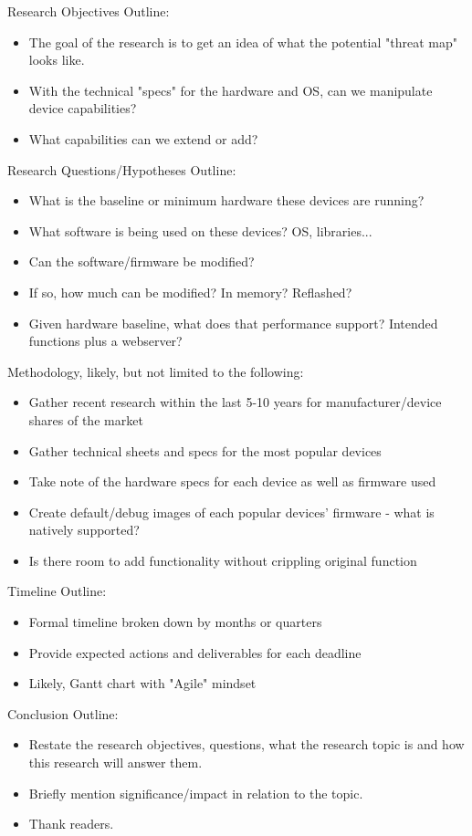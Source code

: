 
Research Objectives Outline:
\begin{itemize}
  \item The goal of the research is to get an idea of what the potential "threat map" looks like.
  \item With the technical "specs" for the hardware and OS, can we manipulate device capabilities?
  \item What capabilities can we extend or add?
\end{itemize}

Research Questions/Hypotheses Outline:
\begin{itemize}
  \item What is the baseline or minimum hardware these devices are running?
  \item What software is being used on these devices? OS, libraries...
  \item Can the software/firmware be modified?
  \item If so, how much can be modified? In memory? Reflashed?
  \item Given hardware baseline, what does that performance support? Intended functions plus a webserver?
\end{itemize}

Methodology, likely, but not limited to the following:
\begin{itemize}
  \item Gather recent research within the last 5-10 years for manufacturer/device shares of the market
  \item Gather technical sheets and specs for the most popular devices
  \item Take note of the hardware specs for each device as well as firmware used
  \item Create default/debug images of each popular devices' firmware - what is natively supported?
  \item Is there room to add functionality without crippling original function
\end{itemize}


Timeline Outline:
\begin{itemize}
  \item Formal timeline broken down by months or quarters
  \item Provide expected actions and deliverables for each deadline
  \item Likely, Gantt chart with "Agile" mindset
\end{itemize}


Conclusion Outline:
\begin{itemize}
  \item Restate the research objectives, questions, what the research topic is and how this research will answer them.
  \item Briefly mention significance/impact in relation to the topic.
  \item Thank readers.
\end{itemize}